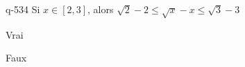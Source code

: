 \begin{truefalse}{q-534}
Si $x\in[2,3]$, alors $\sqrt 2 - 2 \leq \sqrt x-x\leq \sqrt 3 - 3$
\item Vrai
\item* Faux
\end{truefalse}

